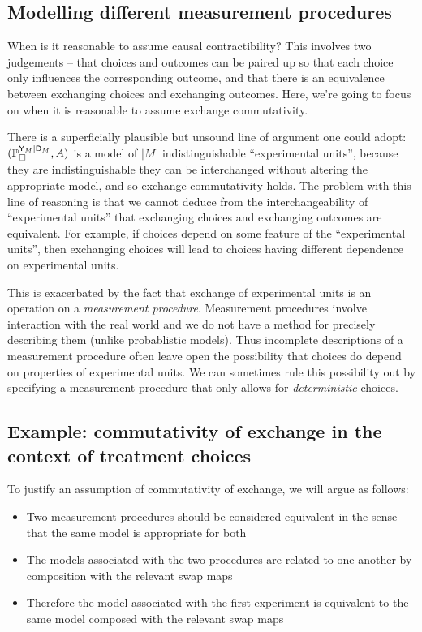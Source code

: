 \subsection{Modelling different measurement procedures}

When is it reasonable to assume causal contractibility? This involves two judgements -- that choices and outcomes can be paired up so that each choice only influences the corresponding outcome, and that there is an equivalence between exchanging choices and exchanging outcomes. Here, we're going to focus on when it is reasonable to assume exchange commutativity. 

There is a superficially plausible but unsound line of argument one could adopt: $(\mathbb{P}_\square^{\mathsf{Y}_M|\mathsf{D}_M},A)$ is a model of $|M|$ indistinguishable ``experimental units'', because they are indistinguishable they can be interchanged without altering the appropriate model, and so exchange commutativity holds. The problem with this line of reasoning is that we cannot deduce from the interchangeability of ``experimental units'' that exchanging choices and exchanging outcomes are equivalent. For example, if choices depend on some feature of the ``experimental units'', then exchanging choices will lead to choices having different dependence on experimental units.

This is exacerbated by the fact that exchange of experimental units is an operation on a \emph{measurement procedure}. Measurement procedures involve interaction with the real world and we do not have a method for precisely describing them (unlike probablistic models). Thus incomplete descriptions of a measurement procedure often leave open the possibility that choices do depend on properties of experimental units. We can sometimes rule this possibility out by specifying a measurement procedure that only allows for \emph{deterministic} choices.

\subsection{Example: commutativity of exchange in the context of treatment choices}

To justify an assumption of commutativity of exchange, we will argue as follows:
\begin{itemize}
    \item Two measurement procedures should be considered equivalent in the sense that the same model is appropriate for both
    \item The models associated with the two procedures are related to one another by composition with the relevant swap maps
    \item Therefore the model associated with the first experiment is equivalent to the same model composed with the relevant swap maps
\end{itemize}

